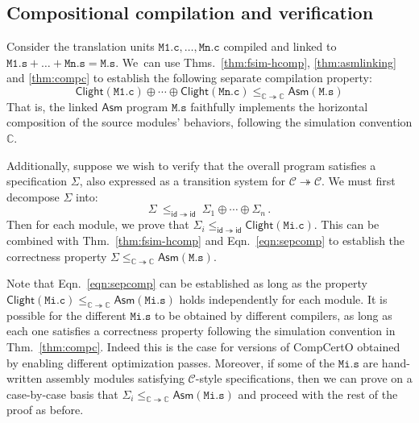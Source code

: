 \documentclass[11pt,oneside,draft]{book}
\theoremstyle{definition}
\newcommand{\kw}[1]{\ensuremath{ \mathsf{#1} }}
\begin{document}

\subsection{Compositional compilation and verification} \label{sec:cver} %

Consider the translation units
$\mathtt{M1.c}, \ldots, \mathtt{Mn.c}$
compiled and linked to
$\mathtt{M1.s} + \ldots + \mathtt{Mn.s} = \mathtt{M.s}$.
We~can use
Thms.~\ref{thm:fsim-hcomp},
\ref{thm:asmlinking} and
\ref{thm:compc}
to establish the following separate compilation property:
\begin{equation}
  \label{eqn:sepcomp}
  \kw{Clight}(\mathtt{M1.c}) \oplus \cdots \oplus \kw{Clight}(\mathtt{Mn.c})
  \le_{\mathbb{C} \twoheadrightarrow \mathbb{C}}
  \kw{Asm}(\mathtt{M.s})
\end{equation}
That is,
the linked \kw{Asm} program
$\mathtt{M.s}$
faithfully implements
the horizontal composition of the source modules' behaviors,
following the simulation convention $\mathbb{C}$.

Additionally,
suppose we wish to verify that the overall program
satisfies a specification $\Sigma$,
also expressed as a transition system
for $\mathcal{C} \twoheadrightarrow \mathcal{C}$.
We must first decompose $\Sigma$
into:
\[
    \Sigma \: \le_{\kw{id} \twoheadrightarrow \kw{id}} \:
    \Sigma_1 \oplus \cdots \oplus \Sigma_n \,.
\]
Then for each module, we prove that
$\Sigma_i \le_{\kw{id} \twoheadrightarrow \kw{id}} \kw{Clight}(\mathtt{Mi.c})$.
This can be combined with Thm.~\ref{thm:fsim-hcomp} and Eqn.~\ref{eqn:sepcomp}
to establish the correctness property
$\Sigma \le_{\mathbb{C} \twoheadrightarrow \mathbb{C}}
        \kw{Asm}(\mathtt{M.s})$.

Note that Eqn.~\ref{eqn:sepcomp} can be established
as long as the property
$\kw{Clight}(\mathtt{Mi.c})
 \le_{\mathbb{C} \twoheadrightarrow \mathbb{C}}
 \kw{Asm}(\mathtt{Mi.s})$
holds independently for each module.
It is possible for the different $\mathtt{Mi.s}$
to be obtained by different compilers,
as long as each one satisfies a correctness property
following the simulation convention in Thm.~\ref{thm:compc}.
Indeed this is the case for versions of CompCertO
obtained by enabling different optimization passes.
Moreover, if some of the $\mathtt{Mi.s}$
are hand-written assembly modules satisfying
$\mathcal{C}$-style specifications,
then we can prove on a case-by-case basis that
$\Sigma_i \le_{\mathbb{C} \twoheadrightarrow \mathbb{C}} \kw{Asm}(\mathtt{Mi.s})$
and proceed with the rest of the proof as before.
\end{document}
